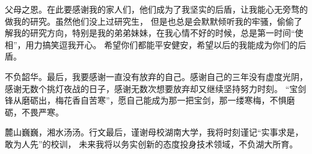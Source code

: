 \begin{acknowledgements}
	父母之恩。在此要感谢我的家人们，他们成为了我坚实的后盾，让我能心无旁骛的做我的研究。虽然他们没上过研究生，
	但是也总是会默默倾听我的牢骚，偷偷了解我的研究方向，特别是我的弟弟妹妹，在我心情不好的时候，总是第一时间“使相”，用力搞笑逗我开心。
	希望你们都能平安健安，希望以后的我能成为你们的后盾。

	不负韶华。最后，我要感谢一直没有放弃的自己。感谢自己的三年没有虚度光阴，感谢无数个挑灯夜战的日子，感谢无数次想要放弃却又继续坚持努力时刻。
	“宝剑锋从磨砺出，梅花香自苦寒”，愿自己能成为那一把宝剑，那一缕寒梅，不惧磨砺，不畏严寒。

	麓山巍巍，湘水汤汤。行文最后，谨谢母校湖南大学，我将时刻谨记“实事求是，敢为人先”的校训，
	未来我将以务实创新的态度投身技术领域，不负湖大所育。

\end{acknowledgements}
